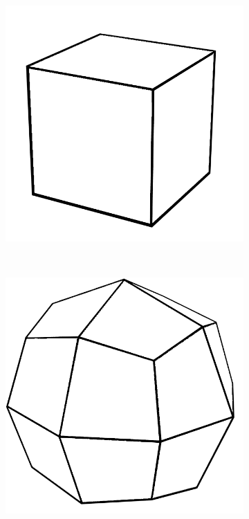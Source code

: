 \begin{figure}
    \centering
    \begin{subfigure}[b]{0.2\textwidth}
        \includegraphics[width=\textwidth]{figures/tessellation/tessellation_cube1.png}
    \end{subfigure}
    ~ %
    \begin{subfigure}[b]{0.2\textwidth}
        \includegraphics[width=\textwidth]{figures/tessellation/tessellation_cube2.png}

\end{subfigure}
\end{figure}
